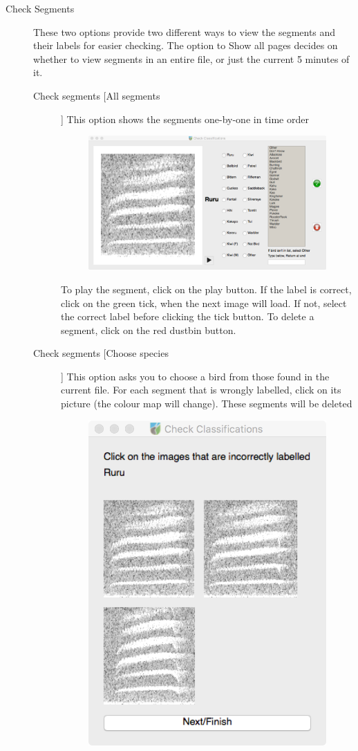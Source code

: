 \documentclass{article}
\begin{document}
\begin{description}
\item [Check Segments] These two options provide two different ways to view the segments and their labels for easier checking. The option to Show all pages decides on whether to view segments in an entire file, or just the current 5 minutes of it. 
	\begin{description}
	\item [Check segments [All segments]] This option shows the segments one-by-one in time order  
	\begin{figure}
	\centering
	\includegraphics[width=.6\textwidth]{Figs/Check1}
	\caption{}
	\label{check1}
	\end{figure}
	To play the segment, click on the play button. If the label is correct, click on the green tick, when the next image will load. If not, select the correct label before clicking the tick button. To delete a segment, click on the red dustbin button. 
	\item [Check segments [Choose species]] This option asks you to choose a bird from those found in the current file. For each segment that is wrongly labelled, click on its picture (the colour map will change). These segments will be deleted  
	\begin{figure}
	\centering
	\includegraphics[width=.4\textwidth]{Figs/Check2}
	\caption{}
	\label{check2}
	\end{figure}
	\end{description}


\end{description}
\end{document}
